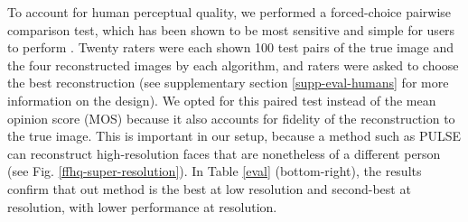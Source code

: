 \documentclass{article}
\begin{document}
To account for human perceptual quality, we performed a forced-choice pairwise comparison test, which has been shown to be most sensitive and simple for users to perform \cite{mantiuk2012comparison}. Twenty raters were each shown 100 test pairs of the true image and the four reconstructed images by each algorithm, and raters were asked to choose the best reconstruction (see supplementary section \ref{supp-eval-humans} for more information on the design). We opted for this paired test instead of the mean opinion score (MOS) because it also accounts for fidelity of the reconstruction to the true image. This is important in our setup, because a method such as PULSE can reconstruct high-resolution faces that are nonetheless of a different person (see Fig. \ref{ffhq-super-resolution}). In Table \ref{eval} (bottom-right), the results confirm that out method is the best at low  resolution and second-best at  resolution, with lower performance at  resolution. 



\newcommand{\tb}[1]{\textbf{#1}}
\newcommand{\lpi}{\multicolumn{1}{c}{\small LPIPS}}
\newcommand{\rms}{\multicolumn{1}{c}{\small RMSE}}
\end{document}

